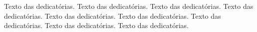 \begin{dedicatoria}
Texto das dedicatórias. Texto das dedicatórias. Texto das dedicatórias. Texto das dedicatórias. Texto das dedicatórias. Texto das dedicatórias. Texto das dedicatórias. Texto das dedicatórias. Texto das dedicatórias.
\end{dedicatoria}